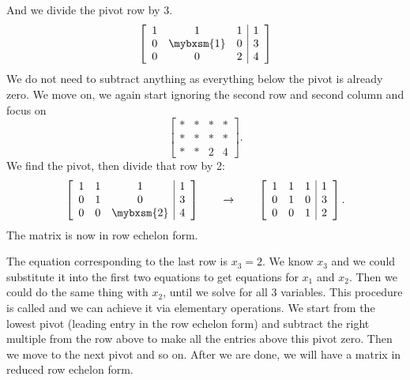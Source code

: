 And we divide the pivot row by 3.
\begin{equation*}
\left[
\begin{array}{ccc|c}
1 & 1 & 1 & 1 \\
0 & \mybxsm{1} & 0 & 3 \\
0 & 0 & 2 & 4
\end{array}
\right]
\end{equation*}
We do not need to subtract anything as everything below the pivot is already
zero.  We move on, we again start ignoring the second row and second
column and focus on 
\begin{equation*}
\left[
\begin{array}{ccc|c}
* & * & * & * \\
* & * & * & * \\
* & * & 2 & 4
\end{array}
\right] .
\end{equation*}
We find the pivot, then divide that row by 2:
\begin{equation*}
\left[
\begin{array}{ccc|c}
1 & 1 & 1 & 1 \\
0 & 1 & 0 & 3 \\
0 & 0 & \mybxsm{2} & 4
\end{array}
\right] 
\qquad \to \qquad
\left[
\begin{array}{ccc|c}
1 & 1 & 1 & 1 \\
0 & 1 & 0 & 3 \\
0 & 0 & 1 & 2
\end{array}
\right] .
\end{equation*}
The matrix is now in row echelon form.

The equation corresponding to the last row is $x_3 = 2$.
We know $x_3$ and we
could substitute it into the first two equations to get equations for
$x_1$ and $x_2$.  Then we could do the same thing with $x_2$, until we solve
for all 3 variables.  This procedure is called
\emph{} and we can achieve it via elementary
operations.
We start from the lowest pivot (leading entry in the row
echelon form) and subtract the right multiple from the row above to
make all the entries above this pivot zero.
Then we move to the next pivot and so on.
After we are done, we will have a matrix in reduced row echelon form.

